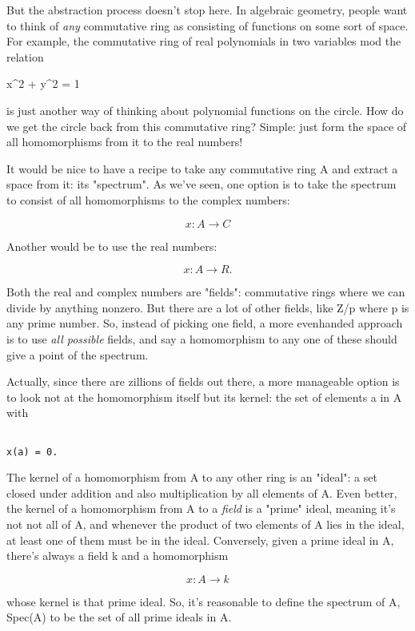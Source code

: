 But the abstraction process doesn't stop here.  In algebraic geometry, 
people want to think of \emph{any} commutative ring as consisting of functions 
on some sort of space.  For example, the commutative ring of real 
polynomials in two variables mod the relation

x^{2} + y^{2} = 1

is just another way of thinking about polynomial functions on the circle.
How do we get the circle back from this commutative ring?  Simple: just 
form the space of all homomorphisms from it to the real numbers! 

It would be nice to have a recipe to take any commutative ring A and
extract a space from it: its "spectrum".  As we've seen, one option is
to take the spectrum to consist of all homomorphisms to the complex
numbers:


$$

x: A \to  C
$$
    

Another would be to use the real numbers:


$$

x: A \to  R.
$$
    

Both the real and complex numbers are "fields": commutative rings
where we can divide by anything nonzero.  But there are a lot of other
fields, like Z/p where p is any prime number.  So, instead of picking
one field, a more evenhanded approach is to use \emph{all possible} fields,
and say a homomorphism to any one of these should give a point of the
spectrum.

Actually, since there are zillions of fields out there, a more
manageable option is to look not at the homomorphism itself but its
kernel: the set of elements a in A with


\begin{verbatim}

x(a) = 0.
\end{verbatim}
    

The kernel of a homomorphism from A to any other ring is an "ideal": a
set closed under addition and also multiplication by all elements of
A.  Even better, the kernel of a homomorphism from A to a \emph{field} is a
"prime" ideal, meaning it's not not all of A, and whenever the product
of two elements of A lies in the ideal, at least one of them must be
in the ideal.  Conversely, given a prime ideal in A, there's always a
field k and a homomorphism


$$

x: A \to  k 
$$
    
whose kernel is that prime ideal.  So, it's reasonable to define 
the spectrum of A, Spec(A) to be the set of all prime ideals in A.  

